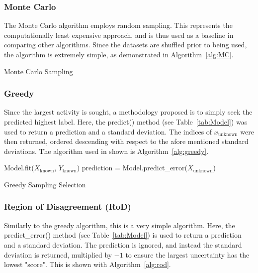 \subsubsection{Monte Carlo}
The Monte Carlo algorithm employs random sampling. This represents the computationally least expensive approach, and is thus used as a baseline in comparing other algorithms. Since the datasets are shuffled prior to being used, the algorithm is extremely simple, as demonstrated in Algorithm~\ref{alg:MC}.

\begin{algorithm}[H]
  \caption{Monte Carlo Sampling}
  \label{alg:MC}\SetAlgoLined
\end{algorithm}

\subsubsection{Greedy}
Since the largest activity is sought, a methodology proposed is to simply seek the predicted highest label. Here, the predict() method (see Table~\ref{tab:Model}) was used to return a prediction and a standard deviation. The indices of $x_\mathrm{unknown}$ were then returned, ordered descending with respect to the afore mentioned standard deviations. The algorithm used in shown is Algorithm~\ref{alg:greedy}.

\begin{algorithm}[H]
  Model.fit($X_\mathrm{known}$, $Y_\mathrm{known}$)\;
  prediction = Model.predict\_error($X_\mathrm{unknown}$)\;
  \caption{Greedy Sampling Selection}
  \label{alg:greedy}\SetAlgoLined
\end{algorithm}

\subsubsection{Region of Disagreement (RoD)}
Similarly to the greedy algorithm, this is a very simple algorithm. Here, the predict\_error() method (see Table~\ref{tab:Model}) is used to return a prediction and a standard deviation. The prediction is ignored, and instead the standard deviation is returned, multiplied by $-1$ to ensure the largest uncertainty has the lowest "score". This is shown with Algorithm~\ref{alg:rod}.

